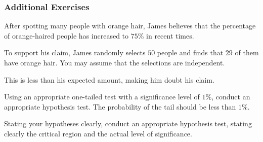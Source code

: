\subsubsection{Additional Exercises}

\begin{example}
    After spotting many people with orange hair, James believes that the percentage of orange-haired people has increased to $75\%$ in recent times.

    To support his claim, James randomly selects $50$ people and finds that $29$ of them have orange hair. You may assume that the selections are independent.

    This is less than his expected amount, making him doubt his claim.

    Using an appropriate one-tailed test with a significance level of $1\%$, conduct an appropriate hypothesis test. The probability of the tail should be less than $1\%$.

    Stating your hypotheses clearly, conduct an appropriate hypothesis test, stating clearly the critical region and the actual level of significance.
\end{example}

